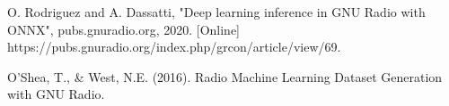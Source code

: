 \documentclass[conference]{IEEEtran}
\begin{document}
\begin{thebibliography}{00}
O. Rodriguez and A. Dassatti, "Deep learning inference in GNU Radio with ONNX", pubs.gnuradio.org, 2020. [Online] https://pubs.gnuradio.org/index.php/grcon/article/view/69.

 O'Shea, T., \& West, N.E. (2016). Radio Machine Learning Dataset Generation with GNU Radio.

\end{thebibliography}
\end{document}
